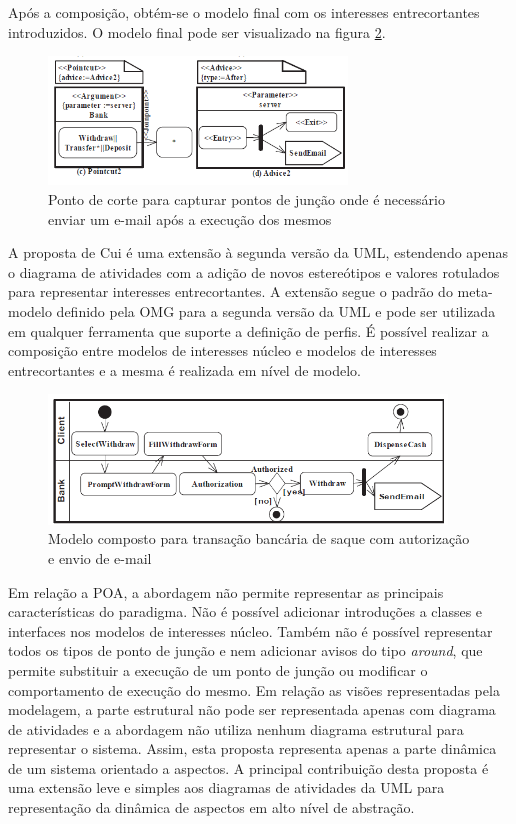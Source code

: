 Após a composição, obtém-se o modelo final com os interesses entrecortantes introduzidos. O modelo final pode ser visualizado na figura
\ref{fig:withdraw_final}.

\begin{figure}[!t]
	\centering
	\includegraphics[width=300px]{img/withdraw_2.png}
	\caption{Ponto de corte para capturar pontos de junção onde é necessário
	enviar um e-mail após a execução dos mesmos}\label{fig:withdraw_2}
\end{figure}

A proposta de Cui é uma extensão à segunda versão da UML, estendendo apenas o diagrama de atividades com a adição de novos estereótipos e valores
rotulados para representar interesses entrecortantes. A extensão segue o padrão do meta-modelo definido pela OMG para a segunda versão da UML e 
pode ser utilizada em qualquer ferramenta que suporte a definição de perfis. É possível realizar a composição entre modelos de interesses núcleo e
modelos de interesses entrecortantes e a mesma é realizada em nível de modelo.

\begin{figure}
	\centering
	\includegraphics[width=400px]{img/withdraw_final.png}
	\caption{Modelo composto para transação bancária de
	saque com autorização e envio de e-mail}\label{fig:withdraw_final}
\end{figure}

Em relação a POA, a abordagem não permite representar as principais características do paradigma. Não é possível adicionar introduções a classes e
interfaces nos modelos de interesses núcleo. Também não é possível representar todos os tipos de ponto de junção e nem adicionar avisos do tipo \textit{around}, que permite
substituir a execução de um ponto de junção ou modificar o comportamento de execução do mesmo. Em relação as visões representadas pela modelagem, a
parte estrutural não pode ser representada apenas com diagrama de atividades e a abordagem não utiliza nenhum diagrama estrutural para representar o
sistema. Assim, esta proposta representa apenas a parte dinâmica de um sistema orientado a aspectos. A principal contribuição desta proposta é uma
extensão leve e simples aos diagramas de atividades da UML para representação da dinâmica de aspectos em alto nível de abstração.

